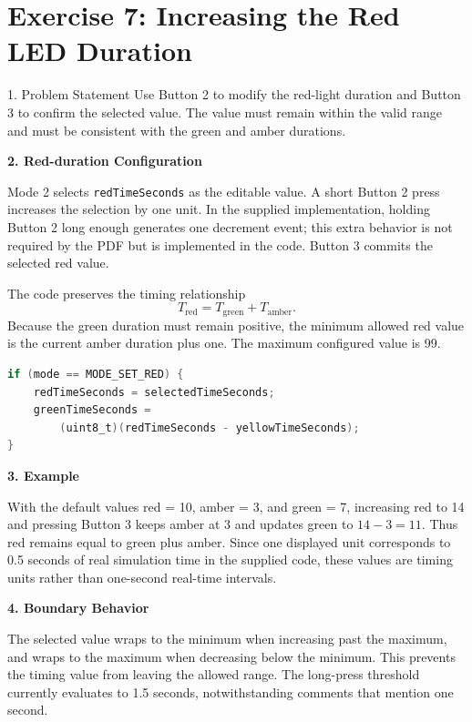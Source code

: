 \clearpage
\section*{Exercise 7: Increasing the Red LED Duration}

\begin{questionbox}{1. Problem Statement}
Use Button 2 to modify the red-light duration and Button 3 to confirm the selected value. The value must remain within the valid range and must be consistent with the green and amber durations.
\end{questionbox}

\vspace{0.4cm}
\textbf{2. Red-duration Configuration}

Mode 2 selects \texttt{redTimeSeconds} as the editable value. A short Button 2 press increases the selection by one unit. In the supplied implementation, holding Button 2 long enough generates one decrement event; this extra behavior is not required by the PDF but is implemented in the code. Button 3 commits the selected red value.

The code preserves the timing relationship
\[
    T_{\mathrm{red}} = T_{\mathrm{green}} + T_{\mathrm{amber}}.
\]
Because the green duration must remain positive, the minimum allowed red value is the current amber duration plus one. The maximum configured value is 99.

\begin{lstlisting}[language=C, caption={Red timing validation and confirmation}, label={lst:exercise7_red_confirm}, captionpos=b]
if (mode == MODE_SET_RED) {
    redTimeSeconds = selectedTimeSeconds;
    greenTimeSeconds =
        (uint8_t)(redTimeSeconds - yellowTimeSeconds);
}
\end{lstlisting}

\textbf{3. Example}

With the default values red = 10, amber = 3, and green = 7, increasing red to 14 and pressing Button 3 keeps amber at 3 and updates green to \(14 - 3 = 11\). Thus red remains equal to green plus amber. Since one displayed unit corresponds to 0.5 seconds of real simulation time in the supplied code, these values are timing units rather than one-second real-time intervals.

\textbf{4. Boundary Behavior}

The selected value wraps to the minimum when increasing past the maximum, and wraps to the maximum when decreasing below the minimum. This prevents the timing value from leaving the allowed range. The long-press threshold currently evaluates to 1.5 seconds, notwithstanding comments that mention one second.

